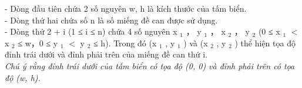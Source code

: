 - Dòng đầu tiên chứa 2 số nguyên w, h là kích thước của tấm biển.   
\\   - Dòng thứ hai chứa số n là số miếng đề can được sử dụng.   
\\   - Dòng thứ 2 + i (1 ≤ i ≤ n) chứa 4 số nguyên x   $_    1   $   ， y   $_    1   $   ， x   $_    2   $   ， y   $_    2   $   (0 ≤ x   $_    1   $   $<$ x   $_    2   $   ≤ w，0 ≤ y   $_    1   $   $<$ y   $_    2   $   ≤ h). Trong đó (x   $_    1   $   , y   $_    1   $   ) và (x   $_    2   $   , y   $_    2   $   ) thể hiện tọa độ đỉnh trái dưới và đỉnh phải trên của miếng đề can thứ i.   
\\\textit{     Chú ý rằng đỉnh trái dưới của tấm biển có tọa độ (0, 0) và đỉnh phải trên có tọa độ (w, h).    }